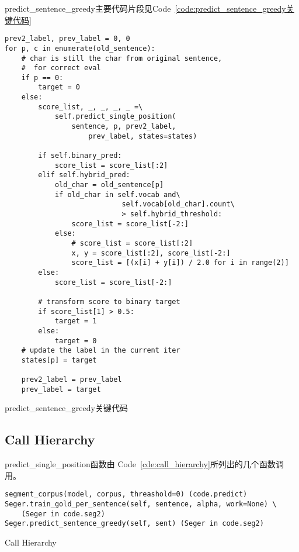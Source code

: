 \documentclass[]{article}
\begin{document}
predict\_sentence\_greedy主要代码片段见Code~\ref{code:predict_sentence_greedy关键代码}
\begin{listing}[H]
\begin{verbatim}
prev2_label, prev_label = 0, 0
for p, c in enumerate(old_sentence):
    # char is still the char from original sentence,
    #  for correct eval
    if p == 0:
        target = 0
    else:
        score_list, _, _, _, _ =\
            self.predict_single_position(
                sentence, p, prev2_label,
                    prev_label, states=states)

        if self.binary_pred:
            score_list = score_list[:2]
        elif self.hybrid_pred:
            old_char = old_sentence[p]
            if old_char in self.vocab and\
                            self.vocab[old_char].count\
                            > self.hybrid_threshold:
                score_list = score_list[-2:]
            else:
                # score_list = score_list[:2]
                x, y = score_list[:2], score_list[-2:]
                score_list = [(x[i] + y[i]) / 2.0 for i in range(2)]
        else:
            score_list = score_list[-2:]

        # transform score to binary target
        if score_list[1] > 0.5:
            target = 1
        else:
            target = 0
    # update the label in the current iter
    states[p] = target

    prev2_label = prev_label
    prev_label = target
\end{verbatim}
\caption{predict\_sentence\_greedy关键代码}
\label{code:predict_sentence_greedy关键代码}
\end{listing}

\subsection{Call Hierarchy}

predict\_single\_position函数由
Code~\ref{cde:call_hierarchy}所列出的几个函数调用。
\begin{listing}[H]
\begin{verbatim}
segment_corpus(model, corpus, threashold=0) (code.predict)
Seger.train_gold_per_sentence(self, sentence, alpha, work=None) \
    (Seger in code.seg2)
Seger.predict_sentence_greedy(self, sent) (Seger in code.seg2)
\end{verbatim}
\caption{Call Hierarchy}
\label{cde:call_hierarchy}
\end{listing}
\end{document}
